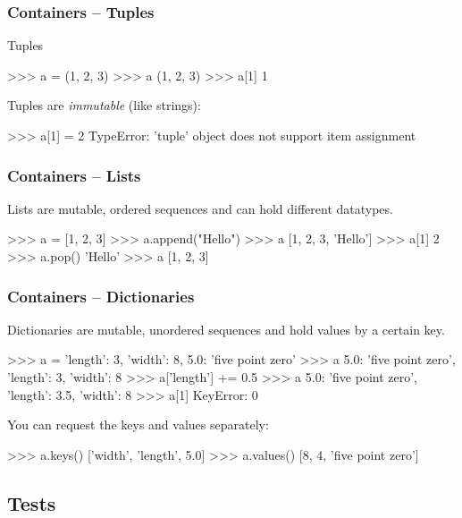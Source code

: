 \documentclass[xetex,10pt]{beamer}
\def\spacer{\vspace*{1em}}
\begin{document}
\begin{frame}[fragile]
	\frametitle{Containers -- Tuples}

Tuples
\begin{python}
>>> a = (1, 2, 3)
>>> a
(1, 2, 3)
>>> a[1]
1
\end{python}

	\spacer
	\pause
Tuples are \emph{immutable} (like strings):
\begin{python}
>>> a[1] = 2
TypeError: 'tuple' object does not support item assignment
\end{python}
\end{frame}

\begin{frame}[fragile]
	\frametitle{Containers -- Lists}

Lists are mutable, ordered sequences and can hold different datatypes.
\begin{python}
>>> a = [1, 2, 3]
>>> a.append("Hello")
>>> a
[1, 2, 3, 'Hello']
>>> a[1]
2
>>> a.pop()
'Hello'
>>> a
[1, 2, 3]
\end{python}

\end{frame}

\begin{frame}[fragile]
	\frametitle{Containers -- Dictionaries}

Dictionaries are mutable, unordered sequences and hold values by a certain key.
\begin{python}
>>> a = {'length': 3, 'width': 8, 5.0: 'five point zero'}
>>> a
{5.0: 'five point zero', 'length': 3, 'width': 8}
>>> a['length'] += 0.5
>>> a
{5.0: 'five point zero', 'length': 3.5, 'width': 8}
>>> a[1]
KeyError: 0
\end{python}


	\spacer
	\pause
You can request the keys and values separately:

\begin{python}
>>> a.keys()
['width', 'length', 5.0]
>>> a.values()
[8, 4, 'five point zero']
\end{python}

\end{frame}

\subsection{Tests}
\end{document}
